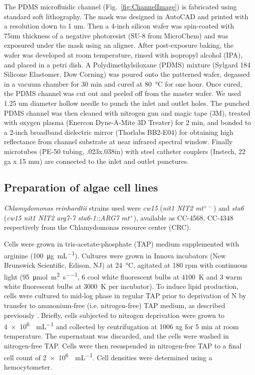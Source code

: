 \documentclass[aps,pra,reprint,superscriptaddress]{revtex4-1}
\begin{document}
The PDMS microfluidic channel (Fig.~\ref{fig:ChannelImage}) is fabricated using standard soft lithography. The mask was designed in AutoCAD and printed with a resolution down to 1 um. Then a 4-inch silicon wafer was spin-coated with 75um thickness of a negative photoresist (SU-8 from MicroChem) and was exposured under the mask using an aligner. After post-exposure baking, the wafer was developed at room temperature, rinsed with isopropyl alcohol (IPA), and placed in a petri dish.  A Polydimethylsiloxane (PDMS) mixture (Sylgard 184 Silicone Elastomer, Dow Corning) was poured onto the patterned wafer, degassed in a vacuum chamber for 30 min and cured at \SI{80}{\degreeCelsius} for one hour. Once cured, the PDMS channel was cut out and peeled off from the master wafer. We used 1.25 um diameter hollow needle to punch the inlet and outlet holes. 
The punched PDMS channel was then cleaned with nitrogen gun and magic tape (3M), treated with oxygen plasma (Enercon Dyne-A-Mite 3D Treater) for 2 min, and bonded to a 2-inch broadband dielectric mirror (Thorlabs BB2-E04) for obtaining high reflectance from channel substrate at near infrared spectral window. Finally microtubes (PE-50 tubing, .023x.038in) with steel catheter couplers (Instech, 22 ga x 15 mm) are connected to the inlet and outlet punctures.

\subsection{Preparation of algae cell lines}

\textit{Chlamydomonas reinhardtii} strains used were \textit{cw15} (\textit{nit1 NIT2 mt$^{+-}$}) and \textit{sta6} (\textit{cw15 nit1 NIT2 arg7-7 sta6-1::ARG7 mt$^+$}), available as CC-4568, CC-4348 respectively from the Chlamydomonas resource center (CRC)\cite{minnesota2015chlamydomonas}.

Cells were grown in tris-acetate-phosphate (TAP) medium supplemented with arginine (\SI{100}{\micro\gram\per\milli\liter}). Cultures were grown in Innova incubators (New Brunswick Scientific, Edison, NJ) at \SI{24}{\degreeCelsius}, agitated at 180 rpm with continuous light (\SI{95}{\micro\mole\per\square\meter\per\second}, 6 cool white fluorescent bulbs at \SI{4100}{\kelvin} and 3 warm white fluorescent bulbs at \SI{3000}{\kelvin} per incubator). To induce lipid production, cells were cultured to mid-log phase in regular TAP prior to deprivation of N by transfer to ammonium-free (i.e. nitrogen-free) TAP medium, as described previously \cite{blaby2013systems}. Briefly, cells subjected to nitrogen deprivation were grown to \SI{4e6}{\cells\per\milli\liter} and collected by centrifugation at 1006 xg for 5 min at room temperature. The supernatant was discarded, and the cells were washed in nitrogen-free TAP. Cells were then resuspended in nitrogen-free TAP to a final cell count of \SI{2e6}{\cells\per\milli\liter}. Cell densities were determined using a hemocytometer.
\end{document}
